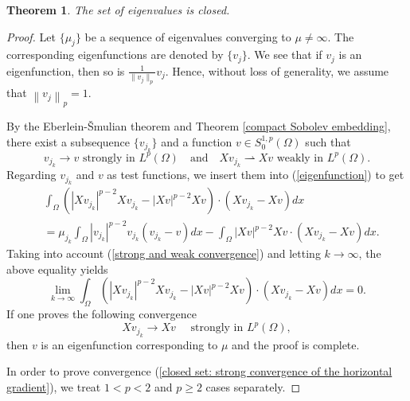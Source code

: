\documentclass[a4paper,12pt,reqno]{amsart}
\renewcommand\eqref[1]{(\ref{#1})} %
\numberwithin{equation}{section}
\theoremstyle{plain}
\newtheorem{thm}{Theorem}[section]
\theoremstyle{definition}
\begin{document}
\begin{thm}\label{closed set}
The set of eigenvalues is closed.
\end{thm}
\begin{proof} 
Let $\{\mu_{j}\}$ be a  sequence of eigenvalues converging to $\mu\neq \infty$. The corresponding  eigenfunctions are denoted by $\{v_{j}\}$. We see that if $v_{j}$ is an eigenfunction, then so is $\frac{1}{\|v_{j}\|_{p}}v_{j}$. Hence, without loss of generality, we assume that
$\left\|v_{j}\right\|_{p}=1$.

By the Eberlein-Šmulian theorem and Theorem \ref{compact Sobolev embedding}, there exist a subsequence $\{v_{j_{k}}\}$ and a function $v\in S_{0}^{1,p}(\Omega)$ such that
\begin{equation}\label{strong and weak convergence}
v_{j_{k}} \to v \text{ strongly in } L^{p}(\Omega)\quad\text{and} \quad X v_{j_{k}} \rightharpoonup  X v \text{ weakly in } L^{p}(\Omega). 
\end{equation}
Regarding $v_{j_{k}}$ and $v$ as test functions, we insert them into \eqref{eigenfunction} to get
\begin{equation*}
\begin{aligned}
&\int_{\Omega}\left(\left|X v_{j_{k}}\right|^{p-2} X v_{j_{k}}-|X v|^{p-2} X v\right) \cdot \left(Xv_{j_{k}}-Xv\right) d x \\
&=\mu_{j_{k}} \int_{\Omega}\left|v_{j_{k}}\right|^{p-2} v_{j_{k}}\left(v_{j_{k}}-v\right) d x-\int_{\Omega}|X v|^{p-2} X v \cdot\left(X v_{j_{k}}-X v\right) d x .
\end{aligned}
\end{equation*}
Taking into account \eqref{strong and weak convergence} and letting $k\to \infty$, the above equality yields 
\begin{equation}\label{closed set: limit}
\lim _{k \rightarrow \infty} \int_{\Omega}\left(\left|X v_{j_{k}}\right|^{p-2} X v_{j_{k}}-|X v|^{p-2} X v\right) \cdot\left(X v_{j_{k}}-X v\right) d x=0 .
\end{equation}
If one proves the following convergence
\begin{equation}\label{closed set: strong convergence of the horizontal gradient}
X v_{j_{k}} \to  X v\quad \text{ strongly in } L^{p}(\Omega), 
\end{equation}
then $v$ is an eigenfunction corresponding to $\mu$ and the proof is complete. 

In order to prove convergence \eqref{closed set: strong convergence of the horizontal gradient}, we treat $1<p<2$ and $p\geq2$ cases separately.


\end{proof}
\end{document}
